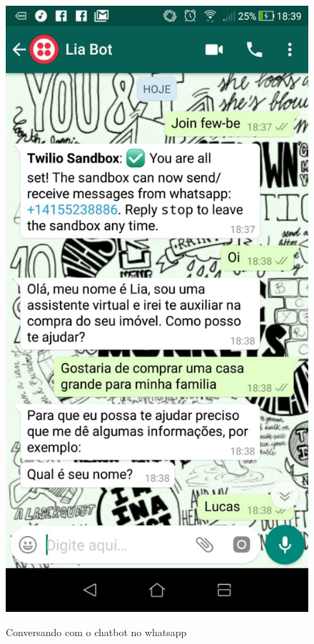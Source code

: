 \begin{figure}[H]
  \centering
   \caption{Conversando com o chatbot no whatsapp}
  \includegraphics[scale=0.5]{Imagens/twilio-conversa2.jpeg} 
  \label{twilio-conversa2}
\end{figure}


